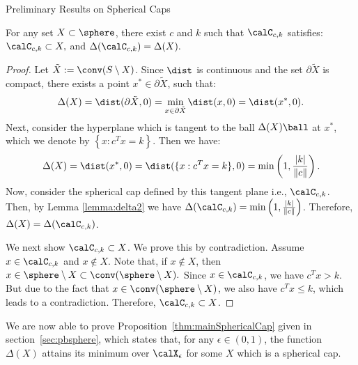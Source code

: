 \begin{section}{Preliminary Results on Spherical Caps}
\begin{lemma}\label{lemma:constructSC}
For any set $X \subset \sphere$, there exist $c$ and $k$ such that $\calC_{c,k}$ satisfies: $\calC_{c,k} \subset X,$ and $\Delta(\calC_{c,k}) = \Delta(X).$
\end{lemma}

\begin{proof} Let $\tilde{X} := \conv(S \setminus X)$.
Since $\dist$ is continuous and the set $\partial \tilde{X}$ is compact, there exists a point $x^* \in \partial \tilde{X}$, such that:
\begin{eqnarray}\nonumber \Delta(X) = \dist(\partial\tilde{X}, 0) = 
\label{deltaSupporting} \min_{x \in \partial \tilde{X}}\dist(x, 0) = \dist(x^*, 0).\end{eqnarray} 
Next, consider the hyperplane which is tangent to the ball $\Delta(X)\ball$ at $x^*$, which we denote by $\left\{x : c^Tx = k\right\}$.
Then we have:
\begin{equation*}\Delta(X) =  \dist(x^*, 0) = \dist(\{x : c^Tx = k\}, 0) = \min\left(1, \frac{|k|}{\|c\|}\right).
\end{equation*}
Now, consider the spherical cap defined by this tangent plane i.e., $\calC_{c, k}$. Then, by Lemma \ref{lemma:delta2} we have
$\Delta(\calC_{c,k}) =  \min\left(1, \frac{|k|}{\|c\|}\right)$. Therefore, $\Delta(X) = \Delta(\calC_{c,k})$.


We next show $\calC_{c, k} \subset X$. We prove this by contradiction. Assume $x \in \calC_{c,k}$ and $x \notin X$. Note that, if $x \notin X$, then $x \in \sphere \setminus X \subset \conv(\sphere \setminus X).$ Since $x \in \calC_{c,k}$, we have $c^Tx>k$. But due to the fact that $x \in \conv(\sphere \setminus X)$, we also have $c^Tx \leq k$, which leads to a contradiction. Therefore, $\calC_{c, k} \subset X$. 
\end{proof}

We are now able to prove Proposition~\ref{thm:mainSphericalCap} given in section~\ref{sec:pbsphere}, which states that, for any $\epsilon \in (0,1)$, the function $\Delta(X)$ attains its minimum over $\calX_{\epsilon}$ for some $X$ which is a spherical cap.



\end{section}
